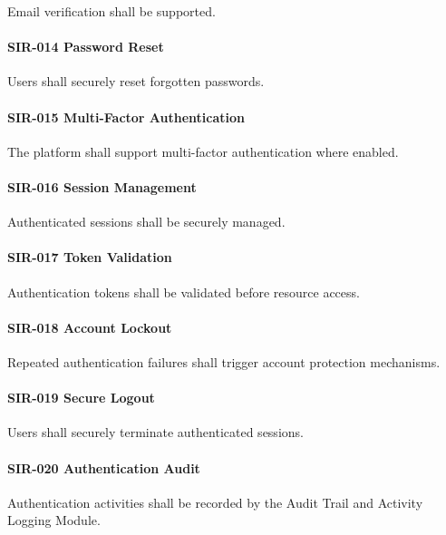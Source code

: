 Email verification shall be supported.

\paragraph{SIR-014 Password Reset}

Users shall securely reset forgotten passwords.

\paragraph{SIR-015 Multi-Factor Authentication}

The platform shall support multi-factor authentication where enabled.

\paragraph{SIR-016 Session Management}

Authenticated sessions shall be securely managed.

\paragraph{SIR-017 Token Validation}

Authentication tokens shall be validated before resource access.

\paragraph{SIR-018 Account Lockout}

Repeated authentication failures shall trigger account protection
mechanisms.

\paragraph{SIR-019 Secure Logout}

Users shall securely terminate authenticated sessions.

\paragraph{SIR-020 Authentication Audit}

Authentication activities shall be recorded by the Audit Trail and
Activity Logging Module.


